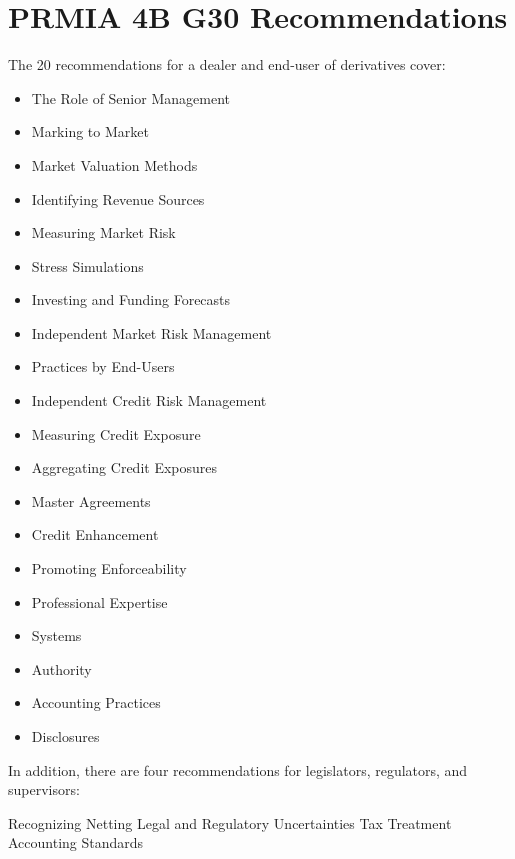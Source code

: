\section{PRMIA 4B G30 Recommendations}
 
The 20 recommendations for a dealer and end-user of derivatives cover:
\begin{itemize}
\item	The Role of Senior Management
\item	Marking to Market
\item	Market Valuation Methods
\item	Identifying Revenue Sources
\item	Measuring Market Risk
\item	Stress Simulations
\item	Investing and Funding Forecasts
\item	Independent Market Risk Management
\item	Practices by End-Users
\item	Independent Credit Risk Management
\item	Measuring Credit Exposure
\item	Aggregating Credit Exposures
\item	Master Agreements
\item	Credit Enhancement
\item	Promoting Enforceability
\item	Professional Expertise
\item	Systems
\item	Authority
\item	Accounting Practices
\item	Disclosures
\end{itemize} 
In addition, there are four recommendations for legislators, regulators, and supervisors:
 
Recognizing Netting
Legal and Regulatory Uncertainties
Tax Treatment
Accounting Standards
 
 
 
 
